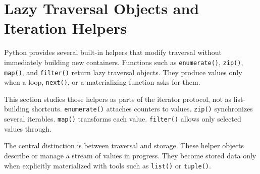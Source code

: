 \section{Lazy Traversal Objects and Iteration Helpers}

Python provides several built-in helpers that modify traversal without immediately building new containers. Functions such as \texttt{enumerate()}, \texttt{zip()}, \texttt{map()}, and \texttt{filter()} return lazy traversal objects. They produce values only when a loop, \texttt{next()}, or a materializing function asks for them.

This section studies those helpers as parts of the iterator protocol, not as list-building shortcuts. \texttt{enumerate()} attaches counters to values. \texttt{zip()} synchronizes several iterables. \texttt{map()} transforms each value. \texttt{filter()} allows only selected values through.

The central distinction is between traversal and storage. These helper objects describe or manage a stream of values in progress. They become stored data only when explicitly materialized with tools such as \texttt{list()} or \texttt{tuple()}.